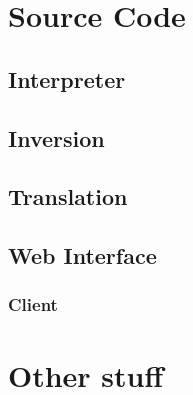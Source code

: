 \begin{appendices}
\lstset{style=appendix}
\makeatletter
{}
\makeatother
  \chapter{Source Code}
  \section{Interpreter}
  \section{Inversion}
  \section{Translation}
  \section{Web Interface}
  \label{app:web}
  \subsection{Client}
  \label{app:web_client}

  \chapter{Other stuff}

\end{appendices}

